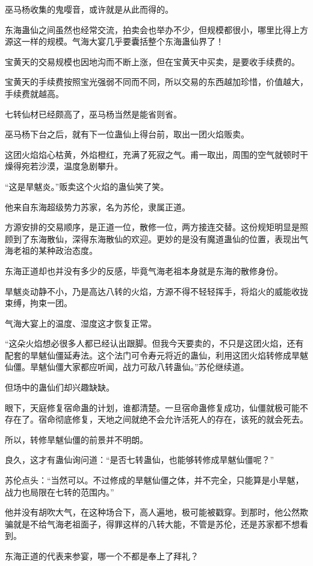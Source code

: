\begin{this_body}
巫马杨收集的鬼嘤音，或许就是从此而得的。

东海蛊仙之间虽然也经常交流，拍卖会也举办不少，但规模都很小，哪里比得上方源这一样的规模。气海大宴几乎要囊括整个东海蛊仙界了！

宝黄天的交易规模也因地沟而不断上涨，但在宝黄天中买卖，是要收手续费的。

宝黄天的手续费按照宝光强弱不同而不同，所以交易的东西越加珍惜，价值越大，手续费就越高。

七转仙材已经颇高了，巫马杨当然是能省则省。

巫马杨下台之后，就有下一位蛊仙上得台前，取出一团火焰贩卖。

这团火焰焰心枯黄，外焰橙红，充满了死寂之气。甫一取出，周围的空气就顿时干燥得宛若沙漠，温度急剧攀升。

“这是旱魃炎。”贩卖这个火焰的蛊仙笑了笑。

他来自东海超级势力苏家，名为苏伦，隶属正道。

方源安排的交易顺序，是正道一位，散修一位，两方接连交替。这份规矩明显是照顾到了东海散仙，深得东海散仙的欢迎。更妙的是没有魔道蛊仙的位置，表现出气海老祖的某种政治态度。

东海正道却也并没有多少的反感，毕竟气海老祖本身就是东海的散修身份。

旱魃炎动静不小，乃是高达八转的火焰，方源不得不轻轻挥手，将焰火的威能收拢束缚，拘束一团。

气海大宴上的温度、湿度这才恢复正常。

“这朵火焰想必很多人都已经认出跟脚。但我今天要卖的，不只是这团火焰，还有配套的旱魃仙僵延寿法。这个法门可令寿元将近的蛊仙，利用这团火焰转修成旱魃仙僵。旱魃仙僵大家都应听闻，战力可敌八转蛊仙。”苏伦继续道。

但场中的蛊仙们却兴趣缺缺。

眼下，天庭修复宿命蛊的计划，谁都清楚。一旦宿命蛊修复成功，仙僵就极可能不存在了。宿命彻底修复，天地之间就绝不会允许活死人的存在，该死的就会死去。

所以，转修旱魃仙僵的前景并不明朗。

良久，这才有蛊仙询问道：“是否七转蛊仙，也能够转修成旱魃仙僵呢？”

苏伦点头：“当然可以。不过修成的旱魃仙僵之体，并不完全，只能算是小旱魃，战力也局限在七转的范围内。”

他并没有胡吹大气，在这种场合下，高人遍地，极可能被戳穿。到那时，他公然欺骗就是不给气海老祖面子，得罪这样的八转大能，不管是苏伦，还是苏家都不想看到。

东海正道的代表来参宴，哪一个不都是奉上了拜礼？


\end{this_body}

